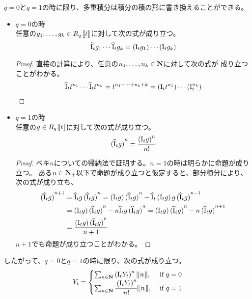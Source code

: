 {	$q=0$と$q=1$の時に限り、多重積分は積分の積の形に書き換えることができる。
	\begin{itemize}\setlength{\itemsep}{-1mm} %
		\item $q=0$の時 \\
		任意の$g_1,\dots,g_k\in R_q\bblr{t}$に対して次の式が成り立つ。
		\begin{equation*}\begin{split}
			\hqI_tg_1\cdots\hqI_tg_k = \plr{\qI_tg_1}\cdots\plr{\qI_tg_k} 
		\end{split}\end{equation*}
		\begin{proof} %
			直接の計算により、任意の$n_1,\dots,n_k\in\sizen$に対して次の式が
			成り立つことがわかる。
			\begin{equation*}\begin{split}
				\hqI_tt^{n_1}\cdots\hqI_tt^{n_k} = t^{n_1+\cdots+n_k+k}
				= \plr{\qI_tt^{n_1}}\cdots\plr{\qI_t^{n_k}} 
			\end{split}\end{equation*}
		\end{proof} %
		\item $q=1$の時 \\
		任意の$g\in R_q\bblr{t}$に対して次の式が成り立つ。
		\begin{equation*}\begin{split}
			\plr{\hqI_tg}^n = \frac{\plr{\qI_tg}^n}{n!}
		\end{split}\end{equation*}
		\begin{proof} %
			ベキ$n$についての帰納法で証明する。$n=1$の時は明らかに命題が成り立つ。
			ある$n\in\sizen_+$以下で命題が成り立つと仮定すると、部分積分により、
			次の式が成り立ち、
			\begin{equation*}\begin{split}
				\plr{\hqI_tg}^{n+1} &= \hqI_tg\plr{\hqI_tg}^n 
				= \plr{\qI_tg}\plr{\hqI_tg}^n 
					- \hqI_t\plr{\qI_tg}g\plr{\hqI_tg}^{n-1} \\
				&= \plr{\qI_tg}\plr{\hqI_tg}^n - n\hqI_tg\plr{\hqI_tg}^n 
				= \plr{\qI_tg}\plr{\hqI_tg}^n - n\plr{\hqI_tg}^{n+1} \\
				&= \frac{\plr{\qI_tg}\plr{\hqI_tg}^n}{n+1}
			\end{split}\end{equation*}
			$n+1$でも命題が成り立つことがわかる。
		\end{proof} %
	\end{itemize} %
	したがって、$q=0$と$q=1$の時に限り、次の式が成り立つ。
	\begin{equation*}\begin{split}
		Y_t = \begin{cases}
			\sum_{n\in\sizen}\plr{\qI_tY_t}^n\word{n}, &\text{ if } q = 0 \\
			\sum_{n\in\sizen}\cfrac{\plr{\qI_tY_t}^n}{n!}\word{n}, &\text{ if } q = 1 \\
		\end{cases}
	\end{split}\end{equation*}

}
